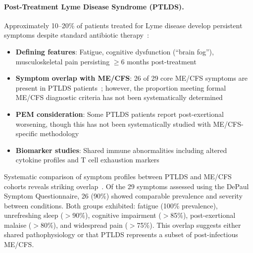 \paragraph{Post-Treatment Lyme Disease Syndrome (PTLDS).}
Approximately 10--20\% of patients treated for Lyme disease develop persistent symptoms despite standard antibiotic therapy~\cite{PTLDSMECFSReview2023}:
\begin{itemize}
    \item \textbf{Defining features}: Fatigue, cognitive dysfunction (``brain fog''), musculoskeletal pain persisting $\geq$6 months post-treatment
    \item \textbf{Symptom overlap with ME/CFS}: 26 of 29 core ME/CFS symptoms are present in PTLDS patients~\cite{PTLDSMECFSReview2023}; however, the proportion meeting formal ME/CFS diagnostic criteria has not been systematically determined
    \item \textbf{PEM consideration}: Some PTLDS patients report post-exertional worsening, though this has not been systematically studied with ME/CFS-specific methodology
    \item \textbf{Biomarker studies}: Shared immune abnormalities including altered cytokine profiles and T cell exhaustion markers
\end{itemize}

\begin{observation}
\label{obs:ptlds-mecfs}
Systematic comparison of symptom profiles between PTLDS and ME/CFS cohorts reveals striking overlap~\cite{PTLDSMECFSReview2023}. Of the 29 symptoms assessed using the DePaul Symptom Questionnaire, 26 (90\%) showed comparable prevalence and severity between conditions. Both groups exhibited: fatigue (100\% prevalence), unrefreshing sleep ($>$90\%), cognitive impairment ($>$85\%), post-exertional malaise ($>$80\%), and widespread pain ($>$75\%). This overlap suggests either shared pathophysiology or that PTLDS represents a subset of post-infectious ME/CFS.
\end{observation}

